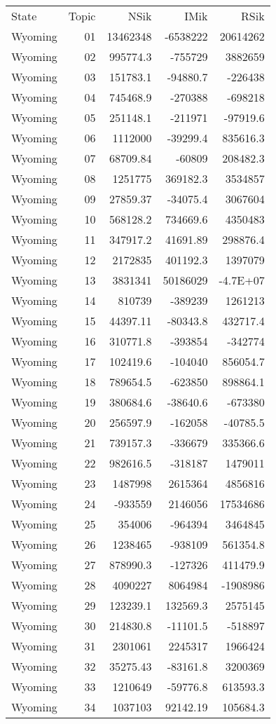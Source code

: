 \begin{table}[]
	\footnotesize
	\begin{tabular}{lrrrr}
		State & Topic & NSik & IMik & RSik \\
		Wyoming &  01 & 13462348 & -6538222 & 20614262 \\
		Wyoming &  02 & 995774.3 & -755729 & 3882659 \\
		Wyoming &  03 & 151783.1 & -94880.7 & -226438 \\
		Wyoming &  04 & 745468.9 & -270388 & -698218 \\
		Wyoming &  05 & 251148.1 & -211971 & -97919.6 \\
		Wyoming &  06 & 1112000 & -39299.4 & 835616.3 \\
		Wyoming &  07 & 68709.84 & -60809 & 208482.3 \\
		Wyoming &  08 & 1251775 & 369182.3 & 3534857 \\
		Wyoming &  09 & 27859.37 & -34075.4 & 3067604 \\
		Wyoming &  10 & 568128.2 & 734669.6 & 4350483 \\
		Wyoming &  11 & 347917.2 & 41691.89 & 298876.4 \\
		Wyoming &  12 & 2172835 & 401192.3 & 1397079 \\
		Wyoming &  13 & 3831341 & 50186029 & -4.7E+07 \\
		Wyoming &  14 & 810739 & -389239 & 1261213 \\
		Wyoming &  15 & 44397.11 & -80343.8 & 432717.4 \\
		Wyoming &  16 & 310771.8 & -393854 & -342774 \\
		Wyoming &  17 & 102419.6 & -104040 & 856054.7 \\
		Wyoming &  18 & 789654.5 & -623850 & 898864.1 \\
		Wyoming &  19 & 380684.6 & -38640.6 & -673380 \\
		Wyoming &  20 & 256597.9 & -162058 & -40785.5 \\
		Wyoming &  21 & 739157.3 & -336679 & 335366.6 \\
		Wyoming &  22 & 982616.5 & -318187 & 1479011 \\
		Wyoming &  23 & 1487998 & 2615364 & 4856816 \\
		Wyoming &  24 & -933559 & 2146056 & 17534686 \\
		Wyoming &  25 & 354006 & -964394 & 3464845 \\
		Wyoming &  26 & 1238465 & -938109 & 561354.8 \\
		Wyoming &  27 & 878990.3 & -127326 & 411479.9 \\
		Wyoming &  28 & 4090227 & 8064984 & -1908986 \\
		Wyoming &  29 & 123239.1 & 132569.3 & 2575145 \\
		Wyoming &  30 & 214830.8 & -11101.5 & -518897 \\
		Wyoming &  31 & 2301061 & 2245317 & 1966424 \\
		Wyoming &  32 & 35275.43 & -83161.8 & 3200369 \\
		Wyoming &  33 & 1210649 & -59776.8 & 613593.3 \\
		Wyoming &  34 & 1037103 & 92142.19 & 105684.3
	\end{tabular}
\end{table}

